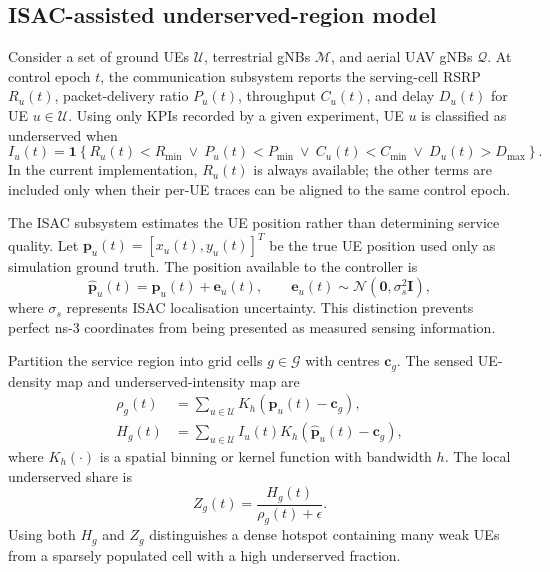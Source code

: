 
\subsection{ISAC-assisted underserved-region model}

Consider a set of ground UEs $\mathcal{U}$, terrestrial gNBs
$\mathcal{M}$, and aerial UAV gNBs $\mathcal{Q}$. At control epoch $t$, the
communication subsystem reports the serving-cell RSRP $R_u(t)$, packet-delivery
ratio $P_u(t)$, throughput $C_u(t)$, and delay $D_u(t)$ for UE
$u\in\mathcal{U}$. Using only KPIs recorded by a given experiment, UE $u$ is
classified as underserved when
\begin{equation}
 I_u(t)=\mathbf{1}\!\left\{
 R_u(t)<R_{\min}\ \lor\
 P_u(t)<P_{\min}\ \lor\
 C_u(t)<C_{\min}\ \lor\
 D_u(t)>D_{\max}
 \right\}.
 \label{eq:underserved-ue}
\end{equation}
In the current implementation, $R_u(t)$ is always available; the other terms
are included only when their per-UE traces can be aligned to the same control
epoch.

The ISAC subsystem estimates the UE position rather than determining service
quality. Let $\mathbf{p}_u(t)=[x_u(t),y_u(t)]^T$ be the true UE position used
only as simulation ground truth. The position available to the controller is
\begin{equation}
 \widehat{\mathbf{p}}_u(t)=\mathbf{p}_u(t)+\mathbf{e}_u(t),
 \qquad
 \mathbf{e}_u(t)\sim\mathcal{N}(\mathbf{0},\sigma_s^2\mathbf{I}),
 \label{eq:isac-location}
\end{equation}
where $\sigma_s$ represents ISAC localisation uncertainty. This distinction
prevents perfect ns-3 coordinates from being presented as measured sensing
information.

Partition the service region into grid cells $g\in\mathcal{G}$ with centres
$\mathbf{c}_g$. The sensed UE-density map and underserved-intensity map are
\begin{align}
 \rho_g(t) &= \sum_{u\in\mathcal{U}}
 K_h\!\left(\widehat{\mathbf{p}}_u(t)-\mathbf{c}_g\right), \\
 H_g(t) &= \sum_{u\in\mathcal{U}} I_u(t)
 K_h\!\left(\widehat{\mathbf{p}}_u(t)-\mathbf{c}_g\right),
 \label{eq:underserved-heatmap}
\end{align}
where $K_h(\cdot)$ is a spatial binning or kernel function with bandwidth $h$.
The local underserved share is
\begin{equation}
 Z_g(t)=\frac{H_g(t)}{\rho_g(t)+\epsilon}.
 \label{eq:underserved-share}
\end{equation}
Using both $H_g$ and $Z_g$ distinguishes a dense hotspot containing many weak
UEs from a sparsely populated cell with a high underserved fraction.


